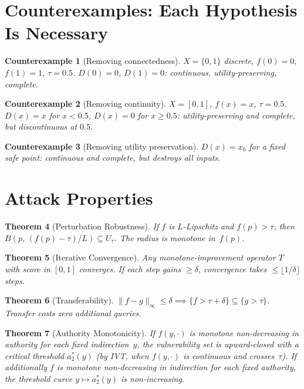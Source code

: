\documentclass[11pt]{article}
\newtheorem{theorem}{Theorem}[section]
\newtheorem{counterexample}[theorem]{Counterexample}
\begin{document}
\section{Counterexamples: Each Hypothesis Is Necessary}
\label{app:counterexamples}

\begin{counterexample}[Removing connectedness]
$X = \{0,1\}$ discrete, $f(0)=0$, $f(1)=1$, $\tau=0.5$.
$D(0)=0$, $D(1)=0$: continuous, utility-preserving, complete.
\end{counterexample}

\begin{counterexample}[Removing continuity]
$X=[0,1]$, $f(x)=x$, $\tau=0.5$. $D(x)=x$ for $x<0.5$,
$D(x)=0$ for $x \geq 0.5$: utility-preserving and complete,
but discontinuous at $0.5$.
\end{counterexample}

\begin{counterexample}[Removing utility preservation]
$D(x) = x_0$ for a fixed safe point: continuous and complete,
but destroys all inputs.
\end{counterexample}


\section{Attack Properties}
\label{app:attacks}

\begin{theorem}[Perturbation Robustness]
\label{thm:lipschitz}
If $f$ is $L$-Lipschitz and $f(p)>\tau$, then
$B(p,\, (f(p)-\tau)/L) \subseteq U_\tau$.
The radius is monotone in~$f(p)$.
\end{theorem}

\begin{theorem}[Iterative Convergence]
\label{thm:convergence}
Any monotone-improvement operator $T$ with score in $[0,1]$ converges.
If each step gains $\geq \delta$, convergence takes
$\leq \lfloor 1/\delta \rfloor$ steps.
\end{theorem}

\begin{theorem}[Transferability]
\label{thm:transfer}
$\|f-g\|_\infty \leq \delta \implies
\{f > \tau+\delta\} \subseteq \{g > \tau\}$.
Transfer costs zero additional queries.
\end{theorem}

\begin{theorem}[Authority Monotonicity]
\label{thm:authority}
If $f(y,\cdot)$ is monotone non-decreasing in authority for each fixed
indirection~$y$, the vulnerability set is upward-closed with a critical
threshold $a^*_2(y)$ (by IVT, when $f(y,\cdot)$ is continuous and
crosses~$\tau$). If additionally $f$ is monotone non-decreasing in
indirection for each fixed authority, the threshold curve
$y \mapsto a^*_2(y)$ is non-increasing.
\end{theorem}
\end{document}
